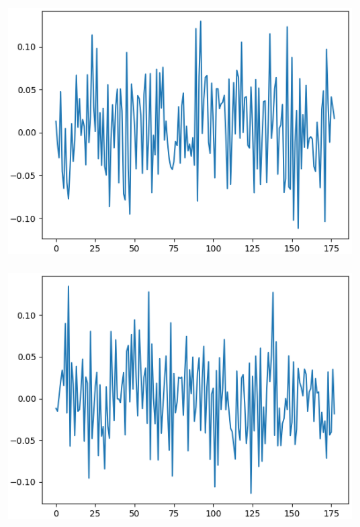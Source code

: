 \documentclass[12pt]{article}
\begin{document}
\begin{figure}
\begin{subfigure}{.5\textwidth}
  \centering
  \includegraphics[width=.8\linewidth]{figures/stack_50_50_dropout_elu_clean_input/weights_neuron_0.eps}
\end{subfigure}%
\begin{subfigure}{.5\textwidth}
  \centering
  \includegraphics[width=.8\linewidth]{figures/stack_50_50_dropout_elu_clean_input/weights_neuron_1.eps}
\end{subfigure}


\end{figure}
\end{document}
